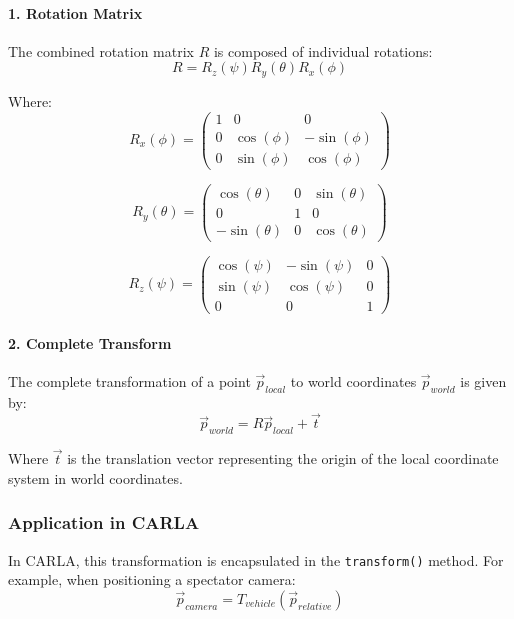 \paragraph{1. Rotation Matrix}
The combined rotation matrix $R$ is composed of individual rotations:
\begin{equation}
R = R_z(\psi)R_y(\theta)R_x(\phi)
\end{equation}

Where:
\begin{equation}
R_x(\phi) = \begin{pmatrix}
1 & 0 & 0 \\
0 & \cos(\phi) & -\sin(\phi) \\
0 & \sin(\phi) & \cos(\phi)
\end{pmatrix}
\end{equation}

\begin{equation}
R_y(\theta) = \begin{pmatrix}
\cos(\theta) & 0 & \sin(\theta) \\
0 & 1 & 0 \\
-\sin(\theta) & 0 & \cos(\theta)
\end{pmatrix}
\end{equation}

\begin{equation}
R_z(\psi) = \begin{pmatrix}
\cos(\psi) & -\sin(\psi) & 0 \\
\sin(\psi) & \cos(\psi) & 0 \\
0 & 0 & 1
\end{pmatrix}
\end{equation}

\paragraph{2. Complete Transform}
The complete transformation of a point $\vec{p}_{local}$ to world coordinates $\vec{p}_{world}$ is given by:
\begin{equation}
\vec{p}_{world} = R\vec{p}_{local} + \vec{t}
\end{equation}

Where $\vec{t}$ is the translation vector representing the origin of the local coordinate system in world coordinates.

\subsubsection{Application in CARLA}
In CARLA, this transformation is encapsulated in the \texttt{transform()} method. For example, when positioning a spectator camera:
\begin{equation}
\vec{p}_{camera} = T_{vehicle}(\vec{p}_{relative})
\end{equation}

